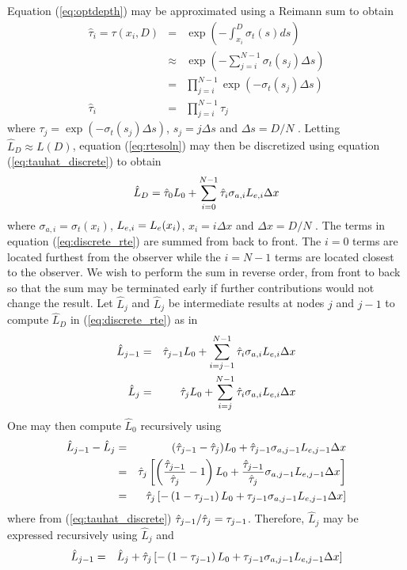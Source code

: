Equation (\ref{eq:optdepth}) may be approximated using a Reimann
sum  to obtain
\begin{eqnarray}
\nonumber
\hat{\tau}_i=\tau(x_i,D)&=&\exp\left(-\int_{x_i}^D\sigma_t(s)ds\right)\\
\nonumber
&\approx&\exp\left(-\sum_{j=i}^{N-1}\sigma_t(s_j)\Delta s\right)\\
\nonumber
&=&\prod_{j=i}^{N-1}\exp\left(-\sigma_t(s_j)\Delta s\right)\\
\label{eq:tauhat_discrete}
\hat{\tau}_i&=&\prod_{j=i}^{N-1}\tau_j
\end{eqnarray}
where $\tau_j=\exp\left(-\sigma_t(s_j)\Delta s\right)$,
$s_j=j\Delta s$ and $\Delta s=D/N$ . Letting $\hat{L}_D\approx L(D)$, equation (\ref{eq:rtesoln})
may then be discretized using equation (\ref{eq:tauhat_discrete})
to obtain
\begin{equation}
\label{eq:discrete_rte}
\hat{L}_D = \hat{\tau}_{0}L_0 +
\sum_{i=0}^{N-1}\hat{\tau}_{i}\sigma_{a,i}L_{e,i}\Delta x
\end{equation}
where $\sigma_{a,i}=\sigma_t(x_i)$, $L_{e,i}=L_e(x_i)$,
$x_i=i\Delta x$ and $\Delta x=D/N$ .
The terms in equation (\ref{eq:discrete_rte}) are summed from back to front.  The $i=0$ terms are located
furthest from the observer while the $i=N-1$ terms are located closest to the observer.  We wish to perform the sum in reverse order, from front to back so that the sum may be terminated early if further contributions would not change the result. Let $\hat{L}_j$ and $\hat{L}_j$ be intermediate results at nodes $j$ and $j-1$
to compute $\hat{L}_D$ in (\ref{eq:discrete_rte}) as in
\begin{eqnarray}
\hat{L}_{j-1} &= &\hat{\tau}_{j-1}L_0 + \sum_{i=j-1}^{N-1}\hat{\tau}_{i}\sigma_{a,i}L_{e,i}\Delta x\\
\hat{L}_j     &= &\hat{\tau}_{j}  L_0 + \sum_{i=j}^{N-1}  \hat{\tau}_{i}\sigma_{a,i}L_{e,i}\Delta x
\end{eqnarray}
One may then compute $\hat{L}_0$ recursively using
\begin{eqnarray}
\hat{L}_{j-1} -\hat{L}_{j}&= &(\hat{\tau}_{j-1}-\hat{\tau}_{j})L_0 + \hat{\tau}_{j-1}\sigma_{a,j-1}L_{e,j-1}\Delta x\\
                        &= &\hat{\tau}_{j}\left[\left(\frac{\hat{\tau}_{j-1}}{\hat{\tau}_{j}}-1\right)L_0 + \frac{\hat{\tau}_{j-1}}{\hat{\tau}_{j}}\sigma_{a,j-1}L_{e,j-1}\Delta x\right]\\
                        &= &\hat{\tau}_{j}\left[-\left(1-\tau_{j-1}\right)L_0 + \tau_{j-1}\sigma_{a,j-1}L_{e,j-1}\Delta x\right]\\
\end{eqnarray}
where from (\ref{eq:tauhat_discrete}) $\hat{\tau}_{j-1}/\hat{\tau}_{j}=\tau_{j-1}$.  Therefore, $\hat{L}_j$ may be expressed recursively using $\hat{L}_{j}$ and
\begin{eqnarray}
\hat{L}_{j-1} &= &\hat{L}_{j}+\hat{\tau}_{j}\left[-\left(1-\tau_{j-1}\right)L_0 + \tau_{j-1}\sigma_{a,j-1}L_{e,j-1}\Delta x\right]
\end{eqnarray}

